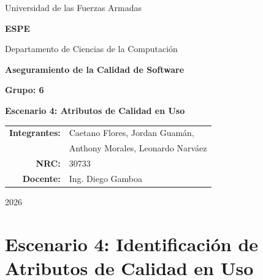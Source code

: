 \documentclass[11pt]{article}
\begin{document}
\begin{titlepage}
\centering
{\Large Universidad de las Fuerzas Armadas\par}
{\LARGE \textbf{ESPE}\par}
\vspace{0.35cm}
{\large Departamento de Ciencias de la Computación\par}
\vspace{1.5cm}
{\Large \textbf{Aseguramiento de la Calidad de Software}\par}
\vspace{0.5cm}
{\large \textbf{Grupo: 6}\par}
\vspace{1.2cm}
{\Large \textbf{Escenario 4: Atributos de Calidad en Uso}\par}
\vfill
\begin{tabular}{rl}
\textbf{Integrantes:} & Caetano Flores, Jordan Guamán,\\
& Anthony Morales, Leonardo Narváez\\
\textbf{NRC:} & 30733\\
\textbf{Docente:} & Ing. Diego Gamboa\\
\end{tabular}
\vfill
{\large 2026\par}
\end{titlepage}

\section*{Escenario 4: Identificación de Atributos de Calidad en Uso}
\end{document}
